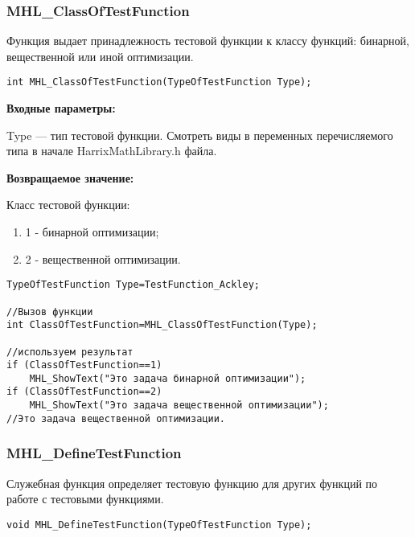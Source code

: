 \documentclass[a4paper,12pt]{article}
\begin{document}
\subsubsection{MHL\_ClassOfTestFunction}\label{MHL_ClassOfTestFunction}

Функция выдает принадлежность тестовой функции к классу функций: бинарной, вещественной или иной оптимизации.


\begin{lstlisting}[label=code_syntax_MHL_ClassOfTestFunction,caption=Синтаксис]
int MHL_ClassOfTestFunction(TypeOfTestFunction Type);
\end{lstlisting}

\textbf{Входные параметры:}

Type --- тип тестовой функции. Смотреть виды в переменных перечисляемого типа в начале HarrixMathLibrary.h файла.

\textbf{Возвращаемое значение:}

Класс тестовой функции:

\begin{enumerate}
\item 1 - бинарной оптимизации;
\item 2 - вещественной оптимизации.
\end{enumerate}


\begin{lstlisting}[label=code_use_MHL_ClassOfTestFunction,caption=Пример использования]
TypeOfTestFunction Type=TestFunction_Ackley;

//Вызов функции
int ClassOfTestFunction=MHL_ClassOfTestFunction(Type);

//используем результат
if (ClassOfTestFunction==1)
    MHL_ShowText("Это задача бинарной оптимизации");
if (ClassOfTestFunction==2)
    MHL_ShowText("Это задача вещественной оптимизации");
//Это задача вещественной оптимизации.
\end{lstlisting}

\subsubsection{MHL\_DefineTestFunction}\label{MHL_DefineTestFunction}

Служебная функция определяет тестовую функцию для других функций по работе с тестовыми функциями.


\begin{lstlisting}[label=code_syntax_MHL_DefineTestFunction,caption=Синтаксис]
void MHL_DefineTestFunction(TypeOfTestFunction Type);
\end{lstlisting}
\end{document}

